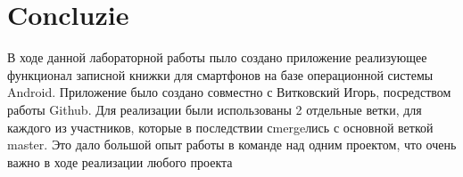 \section*{Concluzie}
{}
В ходе данной лабораторной работы пыло создано приложение реализующее функционал записной книжки для смартфонов на базе операционной системы Android. Приложение было создано совместно с Витковский Игорь, посредством работы Github. Для реализации были использованы 2 отдельные ветки, для каждого из участников, которые в последствии сmergeлись с основной веткой master. Это дало большой опыт работы в команде над одним проектом, что очень важно в ходе реализации любого проекта 

\clearpage